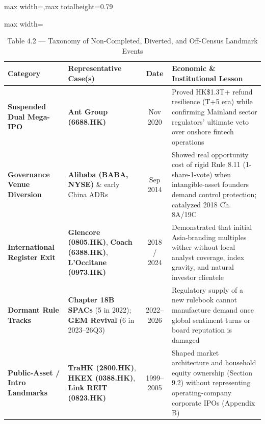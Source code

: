 \documentclass[11pt,letterpaper]{article}
\begin{document}
\begin{table}[!htbp]
\centering
\caption*{Table 4.2 — Taxonomy of Non-Completed, Diverted, and Off-Census Landmark Events}
\begin{adjustbox}{max width=\textwidth,max totalheight=0.79\textheight}
\begin{minipage}{\textwidth}\centering
\footnotesize
\setlength{\tabcolsep}{3.5pt}
\renewcommand{\arraystretch}{1.18}
\begin{adjustbox}{max width=\textwidth}
\begin{tabular}{>{\raggedright\arraybackslash}p{3.43cm}>{\raggedright\arraybackslash}p{5.53cm}c>{\raggedright\arraybackslash}p{5.53cm}}
\toprule
Category & Representative Case(s) & Date & Economic \& Institutional Lesson \\
\midrule
\textbf{Suspended Dual Mega-IPO} & \textbf{Ant Group (6688.HK)} & Nov 2020 & Proved HK\$1.3T+ refund resilience (T+5 era) while confirming Mainland sector regulators’ ultimate veto over onshore fintech operations \\
\textbf{Governance Venue Diversion} & \textbf{Alibaba (BABA, NYSE)} \& early China ADRs & Sep 2014 & Showed real opportunity cost of rigid Rule 8.11 (1-share-1-vote) when intangible-asset founders demand control protection; catalyzed 2018 Ch. 8A/19C \\
\textbf{International Register Exit} & \textbf{Glencore (0805.HK)}, \textbf{Coach (6388.HK)}, \textbf{L’Occitane (0973.HK)} & 2018 / 2024 & Demonstrated that initial Asia-branding multiples wither without local analyst coverage, index gravity, and natural investor clientele \\
\textbf{Dormant Rule Tracks} & \textbf{Chapter 18B SPACs} (5 in 2022); \textbf{GEM Revival} (6 in 2023–26Q3) & 2022–2026 & Regulatory supply of a new rulebook cannot manufacture demand once global sentiment turns or board reputation is damaged \\
\textbf{Public-Asset / Intro Landmarks} & \textbf{TraHK (2800.HK)}, \textbf{HKEX (0388.HK)}, \textbf{Link REIT (0823.HK)} & 1999–2005 & Shaped market architecture and household equity ownership (Section 9.2) without representing operating-company corporate IPOs (Appendix B) \\
\bottomrule
\end{tabular}
\end{adjustbox}
\end{minipage}
\end{adjustbox}

\end{table}
\end{document}
